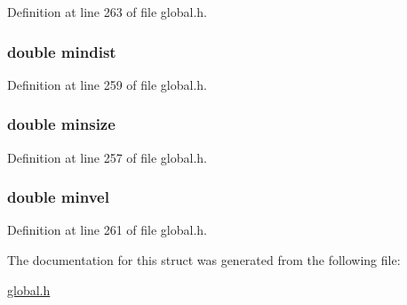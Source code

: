 Definition at line 263 of file global.\-h.

\hypertarget{structstatisticsData_a78455d23ec97258967b76cbb2332b7be}{
\subsubsection[{mindist}]{\setlength{\rightskip}{0pt plus 5cm}double mindist}}\label{structstatisticsData_a78455d23ec97258967b76cbb2332b7be}


Definition at line 259 of file global.\-h.

\hypertarget{structstatisticsData_ad99dc4104d1898b6e593bbf331e41c69}{
\subsubsection[{minsize}]{\setlength{\rightskip}{0pt plus 5cm}double minsize}}\label{structstatisticsData_ad99dc4104d1898b6e593bbf331e41c69}


Definition at line 257 of file global.\-h.

\hypertarget{structstatisticsData_a1b9d00ac67b4ceca8e7747a50edc802b}{
\subsubsection[{minvel}]{\setlength{\rightskip}{0pt plus 5cm}double minvel}}\label{structstatisticsData_a1b9d00ac67b4ceca8e7747a50edc802b}


Definition at line 261 of file global.\-h.



The documentation for this struct was generated from the following file\-:\begin{DoxyCompactItemize}
\item 
\hyperlink{global_8h}{global.\-h}\end{DoxyCompactItemize}

